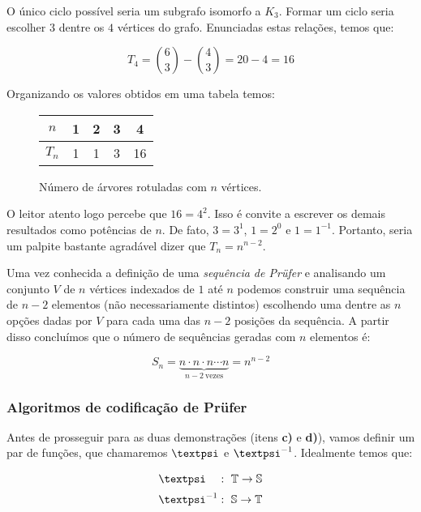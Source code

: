 \documentclass{homework}
\begin{document}
	O único ciclo possível seria um subgrafo isomorfo a $K_3$. Formar um ciclo seria escolher $3$ dentre os $4$ vértices do grafo. Enunciadas estas relações, temos que:\par
	
	$$T_4 = {6 \choose 3} - {4 \choose 3} = 20 - 4 = 16$$
	
	Organizando os valores obtidos em uma tabela temos:\par
	
	\begin{figure}[H]
		\centering
		\begin{tabular}{|c|c|c|c|c|}
			\hline
			$n$ & 1 & 2 & 3 & 4 \\
			\hline
			$T_n$ & 1 & 1 & 3 & 16 \\
			\hline
		\end{tabular}
		\caption{Número de árvores rotuladas com $n$ vértices.}
	\end{figure}

	O leitor atento logo percebe que $16 = 4^2$. Isso é convite a escrever os demais resultados como potências de $n$. De fato, $3 = 3^1$, $1 = 2^0$ e $1 = 1^{-1}$. Portanto, seria um palpite bastante agradável dizer que $T_n = n^{n-2}$.\par

	\subsubquest Uma vez conhecida a definição de uma \textit{sequência de Prüfer} e analisando um conjunto $V$ de $n$ vértices indexados de $1$ até $n$ podemos construir uma sequência de $n - 2$ elementos (não necessariamente distintos) escolhendo uma dentre as $n$ opções dadas por $V$ para cada uma das $n - 2$ posições da sequência. A partir disso concluímos que o número de sequências geradas com $n$ elementos é:\par
	
		$$S_n = \underbrace{n \cdot n \cdot n \cdots n}_{n - 2 ~ \text{vezes}} = n^{n-2}$$
		
	\subsubsection*{Algoritmos de codificação de Prüfer}
	
	Antes de prosseguir para as duas demonstrações (itens \textbf{c)} e \textbf{d)}), vamos definir um par de funções, que chamaremos $\text{\textpsi}$ e $\text{\textpsi}^{-1}$. Idealmente temos que:\par

	$$\text{\textpsi}\phantom{^{-1}}:~ \mathbb{T} \to \mathbb{S}$$
	$$\text{\textpsi}^{-1}:~ \mathbb{S} \to \mathbb{T}$$
	
\end{document}
